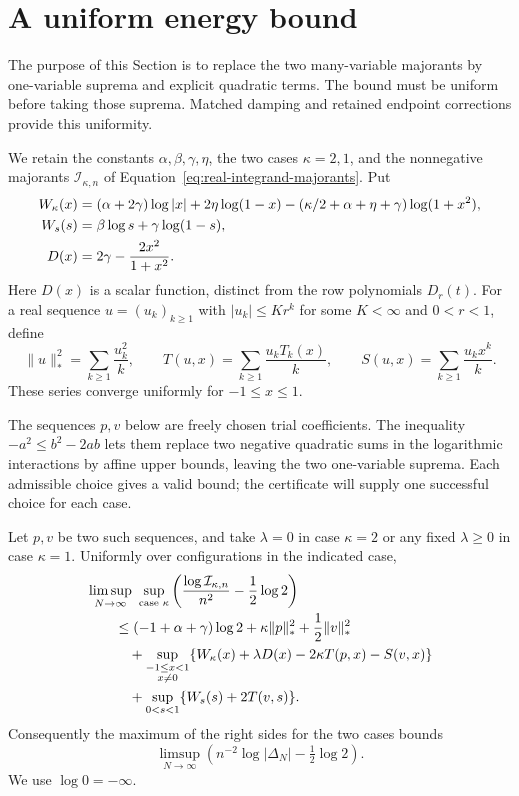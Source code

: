 \section{A uniform energy bound}\label{sec:energy}
The purpose of this Section is to replace the two many-variable
majorants by one-variable suprema and explicit quadratic terms. The
bound must be uniform before taking those suprema. Matched damping
and retained endpoint corrections provide this uniformity.

We retain the constants $\alpha,\beta,\gamma,\eta$, the two cases
$\kappa=2,1$, and the nonnegative majorants $\mathcal I_{\kappa,n}$ of
Equation~\eqref{eq:real-integrand-majorants}.  Put
\begin{align}
 W_\kappa(x)&=(\alpha+2\gamma)\log|x|+2\eta\log(1-x)
 -(\kappa/2+\alpha+\eta+\gamma)\log(1+x^2),\notag\\
 W_s(s)&=\beta\log s+\gamma\log(1-s),\notag\\
 D(x)&=2\gamma-\frac{2x^2}{1+x^2}.
 \label{eq:energy-fields}
\end{align}
Here $D(x)$ is a scalar function, distinct from the row polynomials $D_r(t)$.
For a real sequence $u=(u_k)_{k\ge1}$ with $|u_k|\le K r^k$ for some
$K<\infty$ and $0<r<1$, define
\begin{equation}\label{eq:energy-trial-notation}
 \|u\|_*^2=\sum_{k\ge1}\frac{u_k^2}{k},\qquad
 T(u,x)=\sum_{k\ge1}\frac{u_kT_k(x)}{k},\qquad
 S(u,x)=\sum_{k\ge1}\frac{u_kx^k}{k}.
\end{equation}
These series converge uniformly for $-1\le x\le1$.

The sequences $p,v$ below are freely chosen trial coefficients. The
inequality $-a^2\le b^2-2ab$ lets them replace two negative quadratic
sums in the logarithmic interactions by affine upper bounds, leaving
the two one-variable suprema. Each admissible choice gives a valid
bound; the certificate will supply one successful choice for each case.

\begin{proposition}\label{prop:energy-reduction}
Let $p,v$ be two such sequences, and take $\lambda=0$ in case $\kappa=2$
or any fixed $\lambda\ge0$ in case $\kappa=1$.  Uniformly over configurations
in the indicated case,
\begin{align}
 &\limsup_{N\to\infty}\ \sup_{\text{case }\kappa}
 \left(\frac{\log\mathcal I_{\kappa,n}}{n^2}
                  -\frac12\log2\right)\notag\\
 &\qquad\le (-1+\alpha+\gamma)\log2
       +\kappa\|p\|_*^2+\frac12\|v\|_*^2\notag\\
 &\qquad\quad+\sup_{\substack{-1\le x<1\\x\ne0}}
       \{W_\kappa(x)+\lambda D(x)-2\kappa T(p,x)-S(v,x)\}\notag\\
 &\qquad\quad+\sup_{0<s<1}\{W_s(s)+2T(v,s)\}.
 \label{eq:energy-dual}
\end{align}
Consequently the maximum of the right sides for the two cases bounds
\[
 \limsup_{N\to\infty}\left(n^{-2}\log|\Delta_N|-\tfrac12\log2\right).
\]
We use $\log0=-\infty$.
\end{proposition}

